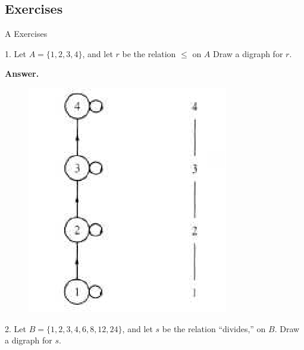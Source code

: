 \documentclass[10pt,]{book}
\theoremstyle{plain}
\theoremstyle{definition}
\theoremstyle{definition}
\theoremstyle{definition}
\theoremstyle{definition}
\begin{document}
\subsection[Exercises]{Exercises}\label{exercises-6-2}
\hypertarget{exercisegroup-3}{}\typeout{************************************************}
\typeout{************************************************}
A Exercises%
\begin{exercisegroup}
\item[1.]\hypertarget{exercise-7}{} Let \(A = \{1, 2, 3, 4\}\), and let \(r\) be the relation \(\leq\) on \(A\) Draw a digraph for \(r\).%
\par\smallskip
\par\smallskip
\noindent\textbf{Answer.}\hypertarget{answer-4}{}\quad
\leavevmode%
\begin{figure}
\centering
\includegraphics[width=1\linewidth]{images/fig-sol-6-2-1.png}
\end{figure}
\item[2.]\hypertarget{exercise-8}{} Let \(B = \{1,2, 3, 4, 6, 8, 12, 24\}\), and let \(s\) be the relation ``divides,'' on \(B\). Draw a digraph for \(s\). %
\par\smallskip

\end{exercisegroup}
\end{document}
